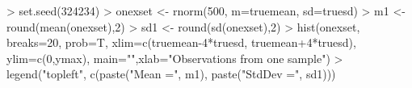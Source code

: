 \begin{Schunk}
\begin{Sinput}
> set.seed(324234)
> onexset <- rnorm(500, m=truemean, sd=truesd)
> m1 <- round(mean(onexset),2)
> sd1 <- round(sd(onexset),2)
> hist(onexset, breaks=20, prob=T, xlim=c(truemean-4*truesd, truemean+4*truesd), ylim=c(0,ymax), main="",xlab="Observations from one sample")
> legend("topleft", c(paste("Mean =", m1), paste("StdDev =", sd1)))
\end{Sinput}
\end{Schunk}

